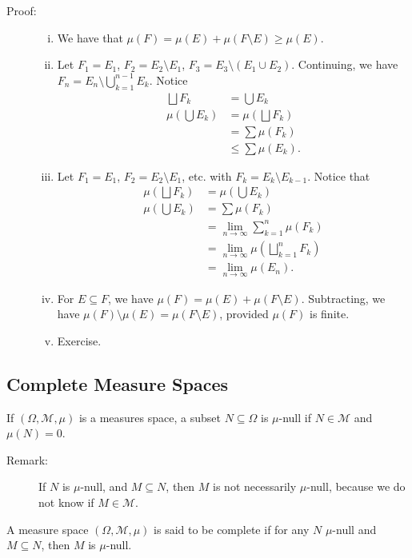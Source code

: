 \documentclass[10pt]{extarticle}
\begin{document}
  \begin{description}
    \item[Proof:]\hfill
      \begin{enumerate}[(i)]
        \item We have that $\mu(F) = \mu(E) + \mu(F\setminus E)\geq \mu(E)$.
        \item Let $F_1 = E_1$, $F_2 = E_2\setminus E_1$, $F_3 = E_3 \setminus (E_1\cup E_2)$. Continuing, we have $F_n = E_n \setminus \bigcup_{k=1}^{n-1} E_k$. Notice
          \begin{align*}
            \bigsqcup F_k &= \bigcup E_k\\
            \mu\left(\bigcup E_k\right) &= \mu\left(\bigsqcup F_k\right)\\
                                        &= \sum \mu(F_k)\\
                                        &\leq \sum \mu(E_k).
          \end{align*}
        \item Let $F_1 = E_1$, $F_2 = E_2 \setminus E_1$, etc. with $F_k = E_k \setminus E_{k-1}$. Notice that
          \begin{align*}
            \mu\left(\bigsqcup F_k\right) &= \mu\left(\bigcup E_k\right)\\
            \mu\left(\bigcup E_k\right) &= \sum \mu(F_k)\\
                                        &= \lim_{n\rightarrow\infty}\sum_{k=1}^{n}\mu(F_k)\\
                                        &= \lim_{n\rightarrow\infty} \mu\left(\bigsqcup_{k=1}^{n}F_k\right)\\
                                        &= \lim_{n\rightarrow\infty}\mu(E_n).
          \end{align*}
        \item For $E\subseteq F$, we have $\mu(F) = \mu(E) + \mu(F\setminus E)$. Subtracting, we have $\mu(F)\setminus \mu(E) = \mu(F\setminus E)$, provided $\mu(F)$ is finite.
        \item Exercise.
      \end{enumerate}
  \end{description}
  \subsection{Complete Measure Spaces}%
  If $(\Omega,\mathcal{M},\mu)$ is a measures space, a subset $N\subseteq \Omega$ is $\mu$-null if $N\in \mathcal{M}$ and $\mu(N) = 0$.
  \begin{description}
    \item[Remark:] If $N$ is $\mu$-null, and $M\subseteq N$, then $M$ is not necessarily $\mu$-null, because we do not know if $M\in \mathcal{M}$.
  \end{description}
  A measure space $(\Omega,\mathcal{M},\mu)$ is said to be complete if for any $N$ $\mu$-null and $M\subseteq N$, then $M$ is $\mu$-null.\\
\end{document}

